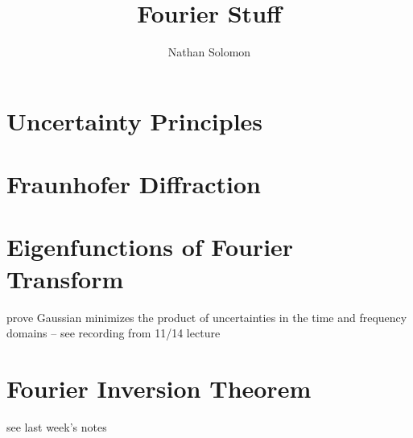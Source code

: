 \documentclass[12pt]{article}
\begin{document}
\title{Fourier Stuff}
\author{Nathan Solomon}
\maketitle

\section{Uncertainty Principles}

\section{Fraunhofer Diffraction}

\section{Eigenfunctions of Fourier Transform}
prove Gaussian minimizes the product of uncertainties in the time and frequency domains -- see recording from 11/14 lecture

\section{Fourier Inversion Theorem}
see last week's notes
\end{document}
